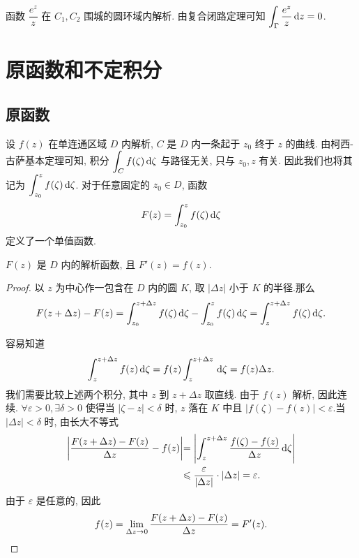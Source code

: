 \begin{solution}
	函数 $\dfrac{e^z}z$ 在 $C_1,C_2$ 围城的圆环域内解析.
	由复合闭路定理可知 $\displaystyle\int_\Gamma\frac{e^z}z\,\mathrm{d} z=0$.
\end{solution}



\section{原函数和不定积分}

\subsection{原函数}

设 $f(z)$ 在单连通区域 $D$ 内解析, $C$ 是 $D$ 内一条起于 $z_0$ 终于 $z$ 的曲线.
由柯西-古萨基本定理可知, 积分 $\displaystyle\int_Cf(\zeta)\,\mathrm{d} \zeta$ 与路径无关, 只与 $z_0,z$ 有关.
因此我们也将其记为 $\displaystyle\int_{z_0}^zf(\zeta)\,\mathrm{d}\zeta$.
对于任意固定的 $z_0\in D$, 函数
\[F(z)=\int_{z_0}^zf(\zeta)\,\mathrm{d}\zeta\]
定义了一个单值函数.

\begin{theorem}[原函数的存在性]
	$F(z)$ 是 $D$ 内的解析函数, 且 $F'(z)=f(z)$.
\end{theorem}

\begin{proof}
	以 $z$ 为中心作一包含在 $D$ 内的圆 $K$,
	取 $|\Delta z|$ 小于 $K$ 的半径.那么
	\[F(z+\Delta z)-F(z)=\int_{z_0}^{z+\Delta z}f(\zeta)\,\mathrm{d}\zeta-\int_{z_0}^zf(\zeta)\,\mathrm{d}\zeta
	=\int_z^{z+\Delta z}f(\zeta)\,\mathrm{d}\zeta.\]

	容易知道
	\[\int_z^{z+\Delta z}f(z)\,\mathrm{d}\zeta=f(z)\int_z^{z+\Delta z}\,\mathrm{d}\zeta=f(z)\Delta z.\]我们需要比较上述两个积分, 其中 $z$ 到 $z+\Delta z$ 取直线.
	由于 $f(z)$ 解析, 因此连续.
	$\forall\varepsilon>0,\exists\delta>0$ 使得当 $|\zeta-z|<\delta$ 时, $z$ 落在 $K$ 中且 $|f(\zeta)-f(z)|<\varepsilon$.当 $|\Delta z|<\delta$ 时, 由长大不等式
		\begin{align*}
		\left|\frac{F(z+\Delta z)-F(z)}{\Delta z}-f(z)\right|
		&{=\left|\int_z^{z+\Delta z}\frac{f(\zeta)-f(z)}{\Delta z}\,\mathrm{d} \zeta\right|}\\
		&{\leqslant\frac{\varepsilon}{|\Delta z|}\cdot|\Delta z|=\varepsilon.}
		\end{align*}
	由于 $\varepsilon$ 是任意的, 因此
	\[f(z)=\lim_{\Delta z\rightarrow 0}\frac{F(z+\Delta z)-F(z)}{\Delta z}=F'(z).\qedhere\]
\end{proof}

\begin{center}
\end{center}


